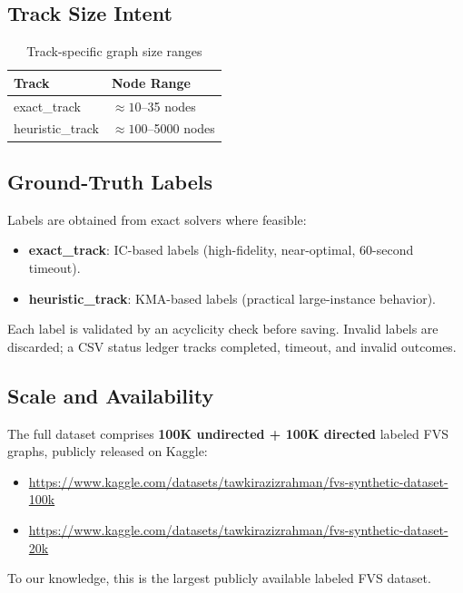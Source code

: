 \documentclass[10pt,a4paper]{report}
\theoremstyle{definition}
\begin{document}
\subsection{Track Size Intent}

\begin{table}[H]
	\centering
	\caption{Track-specific graph size ranges}
	\label{tab:track_sizes}
	\begin{tabular}{ll}
		\toprule
		\textbf{Track}   & \textbf{Node Range}       \\
		\midrule
		exact\_track     & $\approx 10$--35 nodes    \\
		heuristic\_track & $\approx 100$--5000 nodes \\
		\bottomrule
	\end{tabular}
\end{table}

\subsection{Ground-Truth Labels}

Labels are obtained from exact solvers where feasible:
\begin{itemize}
	\item \textbf{exact\_track}: IC-based labels (high-fidelity, near-optimal, 60-second timeout).
	\item \textbf{heuristic\_track}: KMA-based labels (practical large-instance behavior).
\end{itemize}

Each label is validated by an acyclicity check before saving. Invalid labels are discarded; a CSV status ledger tracks completed, timeout, and invalid outcomes.

\subsection{Scale and Availability}

The full dataset comprises \textbf{100K undirected + 100K directed} labeled FVS graphs, publicly released on Kaggle:
\begin{itemize}
	\item \url{https://www.kaggle.com/datasets/tawkirazizrahman/fvs-synthetic-dataset-100k}
	\item \url{https://www.kaggle.com/datasets/tawkirazizrahman/fvs-synthetic-dataset-20k}
\end{itemize}
To our knowledge, this is the largest publicly available labeled FVS dataset.
\end{document}
